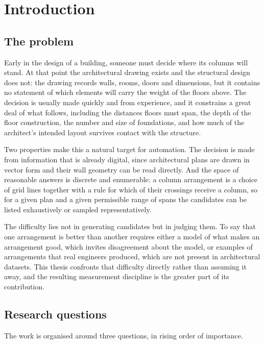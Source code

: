 \chapter{Introduction}
\label{ch:intro}

\section{The problem}
\label{sec:problem}

Early in the design of a building, someone must decide where its columns
will stand. At that point the architectural drawing exists and the
structural design does not: the drawing records walls, rooms, doors and
dimensions, but it contains no statement of which elements will carry the
weight of the floors above. The decision is usually made quickly and from
experience, and it constrains a great deal of what follows, including the
distances floors must span, the depth of the floor construction, the
number and size of foundations, and how much of the architect's intended
layout survives contact with the structure.

Two properties make this a natural target for automation. The decision is
made from information that is already digital, since architectural plans
are drawn in vector form and their wall geometry can be read directly. And
the space of reasonable answers is discrete and enumerable: a column
arrangement is a choice of grid lines together with a rule for which of
their crossings receive a column, so for a given plan and a given
permissible range of spans the candidates can be listed exhaustively or
sampled representatively.

The difficulty lies not in generating candidates but in judging them. To
say that one arrangement is better than another requires either a model of
what makes an arrangement good, which invites disagreement about the
model, or examples of arrangements that real engineers produced, which are
not present in architectural datasets. This thesis confronts that
difficulty directly rather than assuming it away, and the resulting
measurement discipline is the greater part of its contribution.

\section{Research questions}
\label{sec:questions}

The work is organised around three questions, in rising order of
importance.

